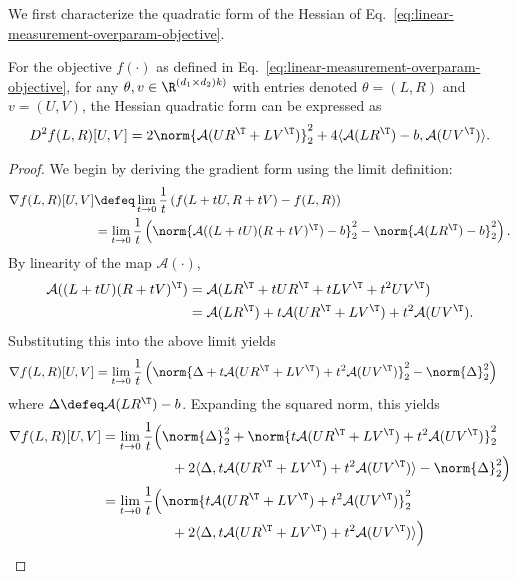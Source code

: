  We first characterize the quadratic form of the Hessian of Eq.~\ref{eq:linear-measurement-overparam-objective}.
\begin{lemma}\label{lemma:linear-measurement-overparam-Hessian-bilinear}
    For the objective $f(\cdot)$ as defined in Eq.~\ref{eq:linear-measurement-overparam-objective}, for any $\theta, v\in \R^{(d_1\times d_2)k)}$ with entries denoted $\theta = (L,R)$ and $v=(U,V)$, the Hessian quadratic form can be expressed as
    \[
        D^2 f(L, R)[U,V] = 2\norm{\mathcal{A}(UR^\T + LV^\T)}^2_2 + 4 \langle \mathcal{A}(LR^\T)-b, \mathcal{A}(UV^\T)\rangle.
    \]
\end{lemma}
\begin{proof}
    We begin by deriving the gradient form using the limit definition:
    \begin{align*}
        \nabla f(L,R)[U,V] &\defeq \lim_{t\rightarrow 0}\frac{1}{t}\left(f(L+tU, R+tV)-f(L,R)\right)\\
        &=\lim_{t\rightarrow 0}\frac{1}{t}\left(\norm{\mathcal{A}((L+tU)(R+tV)^\T) - b}^2_2 - \norm{\mathcal{A}(LR^\T) - b}^2_2\right).
    \end{align*}
    By linearity of the map $\mathcal{A}(\cdot)$,
    \begin{align*}
        \mathcal{A}((L+tU)(R+tV)^\T) &= \mathcal{A}(LR^\T + tUR^\T + tLV^\T + t^2 UV^\T)\\
        &= \mathcal{A}(LR^\T) + t \mathcal{A}(UR^\T + LV^\T) + t^2 \mathcal{A}(UV^\T).
    \end{align*}
    Substituting this into the above limit yields
    \begin{align*}
        \nabla f(L,R)[U,V] &=\lim_{t\rightarrow 0}\frac{1}{t}\left(\norm{\Delta + t\mathcal{A}(UR^\T + LV^\T) + t^2 \mathcal{A}(UV^\T)}^2_2 -\norm{\Delta}^2_2\right)
    \end{align*}
    where $\Delta \defeq \mathcal{A}(LR^\T)-b$. Expanding the squared norm, this yields
    \begin{align*}
        \nabla f(L,R)[U,V] &=\lim_{t\rightarrow 0}\frac{1}{t}\Big(\norm{\Delta}^2_2 + \norm{t\mathcal{A}(UR^\T + LV^\T) + t^2 \mathcal{A}(UV^\T)}^2_2\\
        &\qquad\qquad\quad + 2 \langle \Delta,t\mathcal{A}(UR^\T + LV^\T) + t^2 \mathcal{A}(UV^\T)\rangle -\norm{\Delta}^2_2\Big)\\
        &=\lim_{t\rightarrow 0}\frac{1}{t}\Big(\norm{t\mathcal{A}(UR^\T + LV^\T) + t^2 \mathcal{A}(UV^\T)}^2_2\\
        &\qquad\qquad\quad +2 \langle \Delta,t\mathcal{A}(UR^\T + LV^\T) + t^2 \mathcal{A}(UV^\T)\rangle\Big)\\

\end{align*}
\end{proof}
